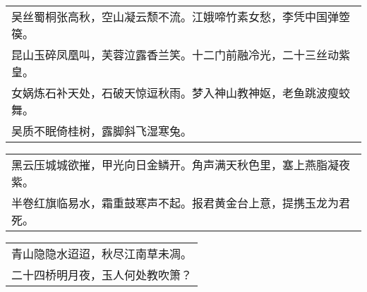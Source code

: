 \nopagebreak%
\nopagebreak%
\noindent\begin{minipage}{\linewidth}
  \vskip-3pt\begin{table}[H]
    \centering
    \begin{tabular}{@{}l@{}}
吴丝蜀桐张高秋，空山凝云颓不流。江娥啼竹素女愁，李凭中国弹箜篌。\\
昆山玉碎凤凰叫，芙蓉泣露香兰笑。十二门前融冷光，二十三丝动紫皇。\\
女娲炼石补天处，石破天惊逗秋雨。梦入神山教神妪，老鱼跳波瘦蛟舞。\\
吴质不眠倚桂树，露脚斜飞湿寒兔。
    \end{tabular}
  \end{table}
\end{minipage}
\vspace{1cm}


\nopagebreak%
\nopagebreak%
\noindent\begin{minipage}{\linewidth}
  \vskip-3pt\begin{table}[H]
    \centering
    \begin{tabular}{@{}l@{}}
黑云压城城欲摧，甲光向日金鳞开。角声满天秋色里，塞上燕脂凝夜紫。\\
半卷红旗临易水，霜重鼓寒声不起。报君黄金台上意，提携玉龙为君死。
    \end{tabular}
  \end{table}
\end{minipage}
\vspace{1cm}


\nopagebreak%
\nopagebreak%
\noindent\begin{minipage}{\linewidth}
  \vskip-3pt\begin{table}[H]
    \centering
    \begin{tabular}{@{}l@{}}
青山隐隐水迢迢，秋尽江南草未凋。\\
二十四桥明月夜，玉人何处教吹箫？
    \end{tabular}
  \end{table}
\end{minipage}
\vspace{1cm}


